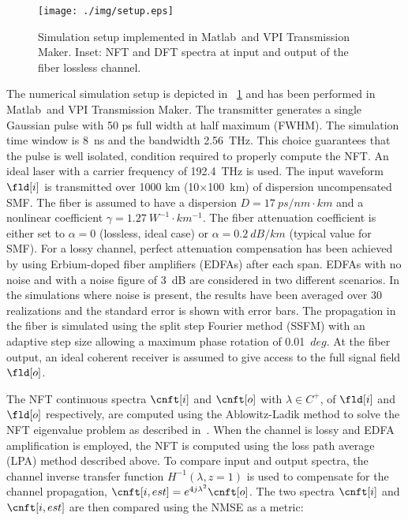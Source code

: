 \begin{figure}[htbp]
  \centering
  \texttt{[image: ./img/setup.eps]}
  \caption{Simulation setup implemented in {Matlab\texttrademark}~and {VPI
Transmission Maker\texttrademark}.
Inset: \ac{NFT} and DFT spectra at input and output of the fiber lossless
channel.}
  \label{fig:setup}
\end{figure}
%
The numerical simulation setup is depicted in \figurename~\ref{fig:setup} and
has been performed in {Matlab\texttrademark}~and {VPI Transmission
Maker\texttrademark}. The transmitter generates a single Gaussian pulse with 50
ps full width at half maximum (FWHM). The simulation time window is 8~ns and the
bandwidth 2.56~THz. This choice guarantees that the pulse is well isolated,
condition required to properly compute the \ac{NFT}. An ideal laser with a
carrier frequency of 192.4~THz is used. The input waveform $\fld[i]$ is
transmitted over 1000 km (10$\times$100~km) of dispersion uncompensated SMF. The
fiber is assumed to have a dispersion $D = 17~ps/nm{\cdot}km$ and a nonlinear
coefficient $\gamma = 1.27~W^{-1}{\cdot}km^{-1}$. The fiber attenuation
coefficient is either set to $\alpha = 0$ (lossless, ideal case) or $\alpha =
0.2~dB/km$ (typical value for SMF). For a lossy channel, perfect attenuation
compensation has been achieved by using Erbium-doped fiber amplifiers (EDFAs)
after each span. EDFAs with no noise and with a noise figure of 3~dB are
considered in two different scenarios. In the simulations where noise is
present, the results have been averaged over 30 realizations and the standard
error is shown with error bars. The propagation in the fiber is simulated using
the split step Fourier method (SSFM) with an adaptive step size allowing a
maximum phase rotation of 0.01~$deg$. At the fiber output, an ideal coherent
receiver is assumed to give access to the full signal field $\fld[o]$.

The \ac{NFT} continuous spectra $\cnft[i]$ and $\cnft[o]$  with $\lambda\in
C^+$, of $\fld[i]$ and $\fld[o]$ respectively, are computed using the
Ablowitz-Ladik method to solve the \ac{NFT} eigenvalue problem as described
in~\cite{yousefi2014information}. When the channel is lossy and EDFA amplification is
employed, the \ac{NFT} is computed using the loss path average (LPA) method
described above. To compare input and output spectra, the channel inverse
transfer function $H^{-1}(\lambda, z=1)$ is used to compensate for the channel
propagation, $\cnft[i, est] = e^{4j\lambda^2}\cnft[o]$. The two spectra
$\cnft[i]$ and $\cnft[i,est]$ are then compared using the NMSE as a metric:

